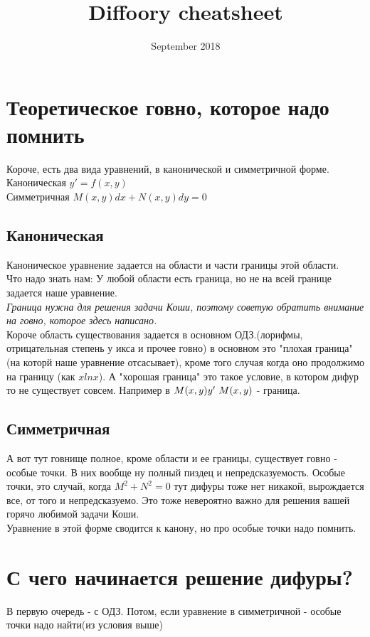 \documentclass[12pt]{article}
\title{Diffoory cheatsheet}
\date{September 2018}
\begin{document}
\maketitle

\section{Теоретическое говно, которое надо помнить}
Короче, есть два вида уравнений, в канонической и симметричной форме.\\
Каноническая $y' = f(x, y)$ \\
Симметричная $M(x,y)dx + N(x,y)dy = 0$
\subsection{Каноническая}
Каноническое уравнение задается на области и части границы этой области. \\
Что надо знать нам: У любой области есть граница, но не на всей границе задается наше уравнение. \\
\textit{Граница нужна для решения задачи Коши, поэтому советую обратить внимание на говно, которое здесь написано.} \\
Короче область существования задается в основном ОДЗ.(лорифмы, отрицательная степень у икса и прочее говно) в основном это "плохая граница"(на которй наше уравнение отсасывает), кроме того случая когда оно продолжимо на границу (как $xlnx$). А "хорошая граница" это такое условие, в котором дифур то не существует совсем. Например в $M(x,y)y' \\\ M(x,y)$ - граница.

\subsection{Симметричная}
А вот тут говнище полное, кроме области и ее границы, существует говно - особые точки. В них вообще ну полный пиздец и непредсказуемость. Особые точки, это случай, когда $M^2 + N^2 = 0$ тут дифуры тоже нет никакой, вырождается все, от того и непредсказуемо. Это тоже невероятно важно для решения вашей горячо любимой задачи Коши. \\
Уравнение в этой форме сводится к канону, но про особые точки надо помнить.

\section{С чего начинается решение дифуры?}
В первую очередь - с ОДЗ. Потом, если уравнение в симметричной - особые точки надо найти(из условия выше)
\end{document}
